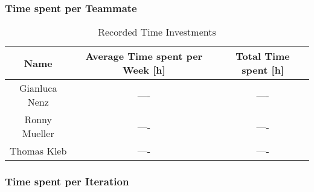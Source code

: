 \subsubsection*{Time spent per Teammate}
\begin{table}[H]
    \centering
    \begin{tabular}{||c c c||} 
        \hline
        Name & Average Time spent per Week [h] & Total Time spent [h]\\ [0.5ex] 
        \hline\hline
        Gianluca Nenz & ---- & ---- \\ 
        \hline
        Ronny Mueller & ---- & ---- \\
        \hline
        Thomas Kleb & ---- & ---- \\ 
        \hline
    \end{tabular}
    \caption{Recorded Time Investments}
    \label{time_ects_recorded}
\end{table}

\subsubsection*{Time spent per Iteration}
